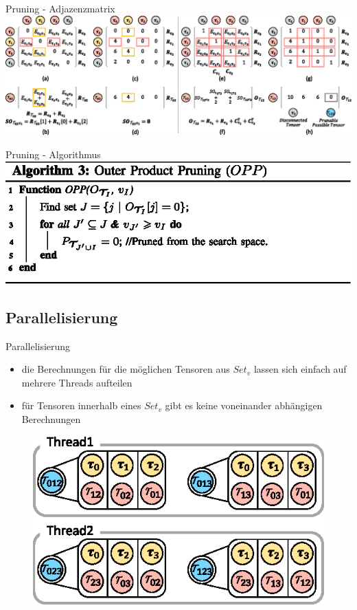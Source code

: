 \documentclass{beamer}
\begin{document}
\begin{frame}{Pruning - Adjazenzmatrix}
	\includegraphics[scale=.6]{figure_05}
\end{frame}

\begin{frame}{Pruning - Algorithmus}
	\includegraphics[scale=1]{algorithm_03}
\end{frame}
\note[itemize]{
	\item
}
\subsection{Parallelisierung}

\begin{frame}{Parallelisierung}
	\begin{itemize}
		\item die Berechnungen für die möglichen Tensoren aus $Set_v$ lassen sich einfach auf mehrere Threads aufteilen
		\item für Tensoren innerhalb eines $Set_v$ gibt es keine voneinander abhängigen Berechnungen
	\end{itemize}
	\begin{figure}
		\includegraphics{figure_07}
	\end{figure}
\end{frame}
\end{document}
